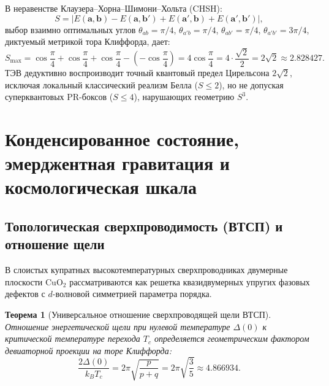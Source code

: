 \documentclass[12pt,a4paper]{article}
\newtheorem{theorem}{Теорема}[section]
\theoremstyle{definition}
\theoremstyle{remark}
\begin{document}
В неравенстве Клаузера--Хорна--Шимони--Хольта (CHSH):
\begin{equation}
	S = |E(\mathbf{a}, \mathbf{b}) - E(\mathbf{a}, \mathbf{b}') + E(\mathbf{a}', \mathbf{b}) + E(\mathbf{a}', \mathbf{b}')|,
	\label{eq:chsh_s}
\end{equation}
выбор взаимно оптимальных углов $\theta_{ab} = \pi/4$, $\theta_{a'b} = \pi/4$, $\theta_{ab'} = \pi/4$, $\theta_{a'b'} = 3\pi/4$, диктуемый метрикой тора Клиффорда, дает:
\begin{equation}
	S_{\max} = \cos\frac{\pi}{4} + \cos\frac{\pi}{4} + \cos\frac{\pi}{4} - \left(-\cos\frac{\pi}{4}\right) = 4 \cos\frac{\pi}{4} = 4 \cdot \frac{\sqrt{2}}{2} = 2\sqrt{2} \approx 2.828427.
	\label{eq:tsirelson_derived}
\end{equation}
ТЭВ дедуктивно воспроизводит точный квантовый предел Цирельсона $2\sqrt{2}$, исключая локальный классический реализм Белла ($S \le 2$), но не допуская суперквантовых PR-боксов ($S \le 4$), нарушающих геометрию $S^3$.


\section{Конденсированное состояние, эмерджентная гравитация и космологическая шкала}
\label{sec:condensed_gravity}

\subsection{Топологическая сверхпроводимость (ВТСП) и отношение щели}
В слоистых купратных высокотемпературных сверхпроводниках двумерные плоскости $\mathrm{CuO}_2$ рассматриваются как решетка квазидвумерных упругих фазовых дефектов с $d$-волновой симметрией параметра порядка.

\begin{theorem}[Универсальное отношение сверхпроводящей щели ВТСП]
	Отношение энергетической щели при нулевой температуре $\Delta(0)$ к критической температуре перехода $T_c$ определяется геометрическим фактором девиаторной проекции на торе Клиффорда:
	\begin{equation}
		\frac{2\Delta(0)}{k_B T_c} = 2\pi \sqrt{\frac{p}{p+q}} = 2\pi \sqrt{\frac{3}{5}} \approx 4.866934.
		\label{eq:htsc_gap_ratio}
	\end{equation}
\end{theorem}
\end{document}

